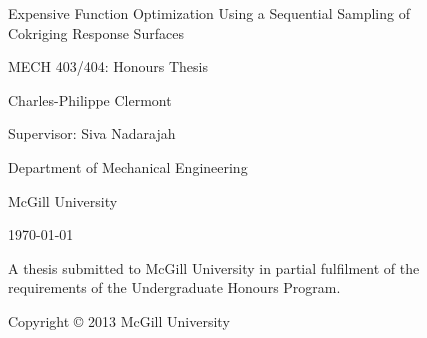 
\begin{titlepage}
\begin{figure}
\doublespacing
\centering

\Large{Expensive Function Optimization Using a Sequential Sampling of Cokriging Response Surfaces}
\vspace{.5in}

\Large{MECH 403/404: Honours Thesis}
\vspace{1.5in}

\large{Charles-Philippe Clermont}

\large{Supervisor: Siva Nadarajah}

\vspace{.5in}

\large{Department of Mechanical Engineering}

\large{McGill University}


\today
\singlespacing
\vspace{1in}

\small{A thesis submitted to McGill University in partial fulfilment
of the requirements of the Undergraduate Honours Program.}

\doublespacing

\small{Copyright \copyright{} 2013 McGill University}


\end{figure}
\end{titlepage}
